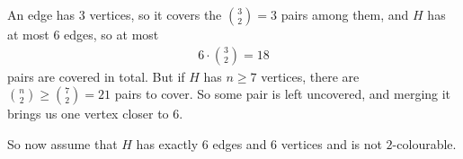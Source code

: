 An edge has $3$ vertices, so it covers the $\binom{3}{2} = 3$ pairs among them, and $H$ has at most $6$ edges, so at most
\begin{align*}
    6 \cdot \binom{3}{2} = 18
\end{align*}
pairs are covered in total. But if $H$ has $n \geq 7$ vertices, there are $\binom{n}{2} \geq \binom{7}{2} = 21$ pairs to cover. So some pair is left uncovered, and merging it brings us one vertex closer to $6$.

So now assume that $H$ has exactly $6$ edges and $6$ vertices and is not $2$-colourable. 